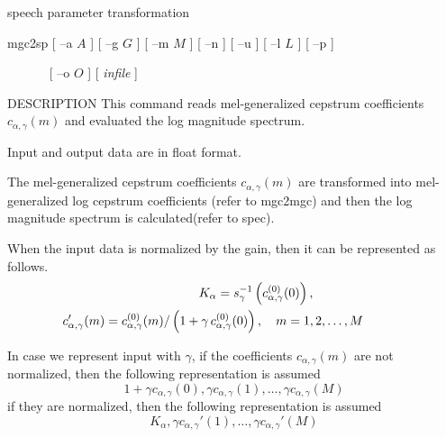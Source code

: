 %
{speech parameter transformation}

\begin{synopsis}
\item[mgc2sp] [ --a $A$ ] [ --g $G$ ] [ --m $M$ ]
	       [ --n ] [ --u ] [ --l $L$ ] [ --p ]
\item[\ ~~~~~] [ --o $O$ ] [ {\em infile} ]
\end{synopsis}

\begin{qsection}{DESCRIPTION}
This command reads mel-generalized cepstrum coefficients
$c_{\alpha, \gamma}(m)$ and evaluated the log magnitude
spectrum.
\par
Input and output data are in float format.
\par
The mel-generalized cepstrum coefficients $c_{\alpha, \gamma}(m)$
are transformed into mel-generalized log cepstrum coefficients
(refer to mgc2mgc)
and then the log magnitude spectrum is calculated(refer to spec).

When the input data is normalized by the gain,
then it can be represented as follows.
\begin{eqnarray*}
\hspace{-15mm}&&K_{\alpha} = 
	s_{\gamma}^{-1}\left(c_{\alpha,\gamma}^{(0)}(0)\right), 
	  \qquad\qquad \\ 
\hspace{-15mm}&&c_{\alpha,\gamma}'(m) =
          c_{\alpha,\gamma}^{(0)}(m)/\left(1+\gamma\,
	  c_{\alpha,\gamma}^{(0)}(0)\right), \quad m = 1,2,\ldots, M 
\end{eqnarray*}

In case we represent input with $\gamma$,
if the coefficients $c_{\alpha,\gamma}(m)$ are not normalized, then
the following representation is assumed
\begin{displaymath}
1+\gamma c_{\alpha,\gamma}(0), \gamma c_{\alpha,\gamma}(1), \ldots, \gamma c_{\alpha,\gamma}(M)
\end{displaymath}
if they are normalized, then
the following representation is assumed
\begin{displaymath}
K_\alpha,\gamma c_{\alpha,\gamma}'(1),\ldots, \gamma c_{\alpha,\gamma}'(M)
\end{displaymath}

\end{qsection}

